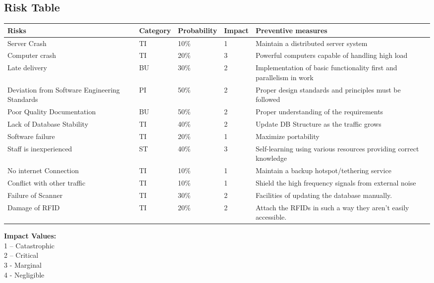 \documentclass[10pt]{article}
\begin{document}
\subsection{Risk Table}
\begin{center}
	\begin{tabular} { |m{4.5cm}|m{3cm}|m{2cm}|m{1.5cm}|m{4cm}| }
		\hline
		\textbf{Risks}  & \textbf{Category} & \textbf{Probability} & \textbf{Impact} & \textbf{Preventive measures}\\ 
			\hline
		Server Crash & TI   & 10\% & 1 & Maintain a distributed server system\\
		\hline
		Computer crash & TI   & 20\% & 3 & Powerful computers capable of handling high load\\
			\hline
		Late delivery & BU   & 30\% & 2 & Implementation of basic functionality first and parallelism in work\\
			\hline
		Deviation from Software Engineering Standards & PI   & 50\% & 2 & Proper design standards and principles must be followed\\
			\hline
		Poor Quality Documentation & BU   & 50\% & 2 & Proper understanding of the requirements\\
			\hline
		Lack of Database Stability & TI   & 40\% & 2 & Update DB Structure as the traffic grows\\
			\hline
		Software failure & TI   & 20\% & 1 & Maximize portability\\
			\hline
		Staff is inexperienced & ST   & 40\% & 3 & Self-learning using various resources providing correct knowledge\\
			\hline
		No internet Connection & TI   & 10\% & 1 & Maintain a backup hotspot/tethering service\\
			\hline
		Conflict with other traffic & TI   & 10\% & 1 & Shield the high frequency signals from external noise\\
			\hline
		Failure of Scanner & TI   & 30\% & 2 & Facilities of updating the database manually.\\
			\hline
		Damage of RFID & TI   & 20\% & 2 & Attach the RFIDs in such a way they aren't easily accessible. \\
		\hline
			\end{tabular}
	\end{center}
\textbf{Impact Values:}	\\	
1 – Catastrophic	\\	
2 – Critical      \\ 
3 - Marginal    \\
4 - Negligible
\end{document}
